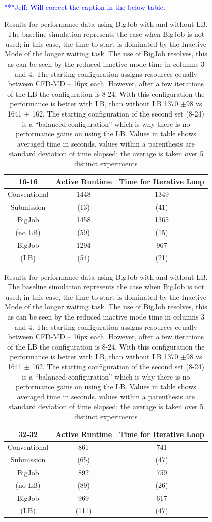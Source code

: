 \documentclass[conference,final]{IEEEtran}
\newcommand{\skonote}[1]{ {\textcolor{blue} { ***Jeff: #1 }}}
\newcommand{\skonote}[1]{}
\begin{document}
\skonote{Will correct the caption in the below table.}


\setlength{\tabcolsep}{1pt}
\begin{table}[!ht]
\begin{center}

  \caption{\small Results for performance data using BigJob with and
    without LB. The baseline simulation represents the case when
    BigJob is not used; in this case, the time to start is dominated
    by the Inactive Mode of the longer waiting task. The use of BigJob
    resolves, this as can be seen by the reduced inactive mode time in
    columns 3 and 4. The starting configuration assigns resources
    equally between CFD-MD -- 16px each. However, after a few
    iterations of the LB the configuration is 8-24. With this
    configuration the performance is better with LB, than without
    LB 1370 $\pm 98$ vs 1641 $\pm$ 162. The starting configuration
    of the second set (8-24) is a ``balanced configuration'' which is
    why there is no performance gains on using the LB. Values in table
    shows averaged time in seconds, values within a parenthesis are
    standard deviation of time elapsed; the average is taken over 5
    distinct experiments}
\label{table:oneBJ_Test}

\begin{tabular}{ c|| c | c }

\hline
16-16 & Active Runtime & Time for Iterative Loop \\
\hline
\hline
Conventional & 1448    & 1349 \\
Submission   & (13)    & (41) \\
\hline
BigJob     & 1458    & 1365 \\
(no LB)    & (59)  & (15)\\
\hline
BigJob     & 1294    & 967 \\
(LB)    & (54)  & (21) \\
\hline
\hline
\end{tabular}


\begin{tabular}{ c|| c | c }
\hline
\hline
32-32 & Active Runtime & Time for Iterative Loop \\
\hline
\hline
Conventional & 861    & 741 \\
Submission   & (65)    & (47) \\
\hline
BigJob     & 892    & 759 \\
(no LB)    & (89)  & (26)\\
\hline
BigJob     & 969    & 617 \\
(LB)    & (111)  & (47) \\
\hline

\end{tabular}
\end{center}
\end{table}
\end{document}
